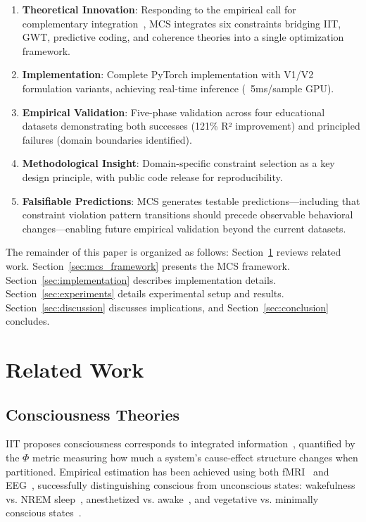 \documentclass[10pt,journal,compsoc]{IEEEtran}
\begin{document}
\begin{enumerate}
    \item \textbf{Theoretical Innovation}: Responding to the empirical call for complementary integration~\cite{Storm2024}, MCS integrates six constraints bridging IIT, GWT, predictive coding, and coherence theories into a single optimization framework.
    
    \item \textbf{Implementation}: Complete PyTorch implementation with V1/V2 formulation variants, achieving real-time inference (~5ms/sample GPU).
    
    \item \textbf{Empirical Validation}: Five-phase validation across four educational datasets demonstrating both successes (121\% R² improvement) and principled failures (domain boundaries identified).
    
    \item \textbf{Methodological Insight}: Domain-specific constraint selection as a key design principle, with public code release for reproducibility.
    
    \item \textbf{Falsifiable Predictions}: MCS generates testable predictions—including that constraint violation pattern transitions should precede observable behavioral changes—enabling future empirical validation beyond the current datasets.
\end{enumerate}

The remainder of this paper is organized as follows: Section~\ref{sec:related_work} reviews related work. Section~\ref{sec:mcs_framework} presents the MCS framework. Section~\ref{sec:implementation} describes implementation details. Section~\ref{sec:experiments} details experimental setup and results. Section~\ref{sec:discussion} discusses implications, and Section~\ref{sec:conclusion} concludes.

\section{Related Work}
\label{sec:related_work}

\subsection{Consciousness Theories}

IIT proposes consciousness corresponds to integrated information~\cite{tononi2004,tononi2008,tononi2016}, quantified by the $\Phi$ metric measuring how much a system's cause-effect structure changes when partitioned. Empirical estimation has been achieved using both fMRI~\cite{fmri-phi} and EEG~\cite{eeg-phi-methods}, successfully distinguishing conscious from unconscious states: wakefulness vs. NREM sleep~\cite{sleep-phi}, anesthetized vs. awake~\cite{anesthesia-phi}, and vegetative vs. minimally conscious states~\cite{disorders-phi}.
\end{document}

